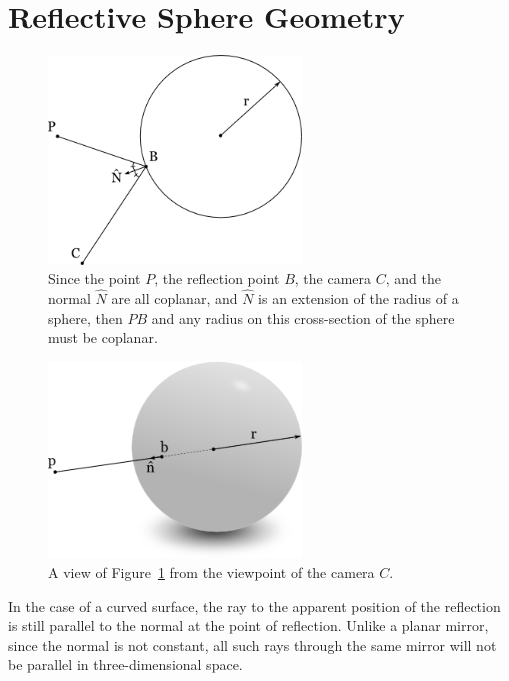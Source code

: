 \documentclass{thesis}
\begin{document}
\section{Reflective Sphere Geometry}
\begin{figure}
	\centering
    	\includegraphics[width=0.6\textwidth]{colinear-radius}
	\caption{Since the point $P$, the reflection point $B$, the camera $C$, and the normal $\hat{N}$ are all coplanar, and $\hat{N}$ is an extension of the radius of a sphere, then $PB$ and any radius on this cross-section of the sphere must be coplanar.}
	\label{colinear-radius}
\end{figure}

\begin{figure}
	\centering
    	\includegraphics[width=0.6\textwidth]{colinear-radius-camera-view}
	\caption{A view of Figure~\ref{colinear-radius} from the viewpoint of the camera $C$.}
	\label{colinear-radius-camera-view}
\end{figure}

In the case of a curved surface, the ray to the apparent position of the reflection is still parallel to the normal at the point of reflection. Unlike a planar mirror, since the normal is not constant, all such rays through the same mirror will not be parallel in three-dimensional space.
\end{document}
